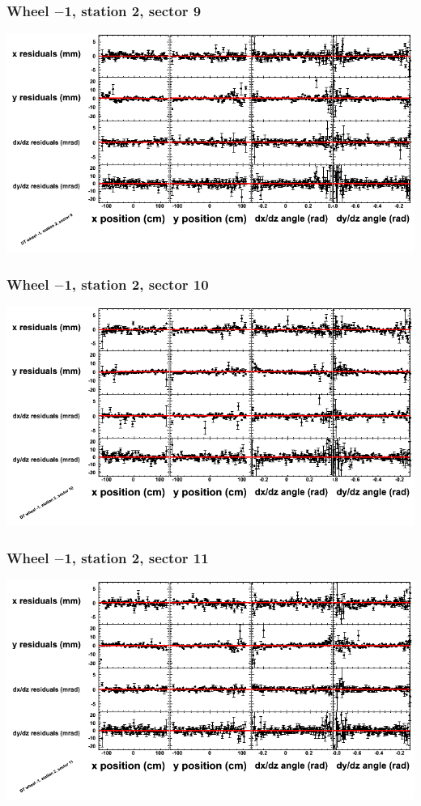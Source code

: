 \documentclass[compress]{beamer}
\begin{document}
\begin{frame}
\frametitle{Wheel $-$1, station 2, sector 9}
\includegraphics[width=\linewidth]{tmppoly_MBwhBst2sec09.png}
\end{frame}

\begin{frame}
\frametitle{Wheel $-$1, station 2, sector 10}
\includegraphics[width=\linewidth]{tmppoly_MBwhBst2sec10.png}
\end{frame}

\begin{frame}
\frametitle{Wheel $-$1, station 2, sector 11}
\includegraphics[width=\linewidth]{tmppoly_MBwhBst2sec11.png}
\end{frame}
\end{document}
